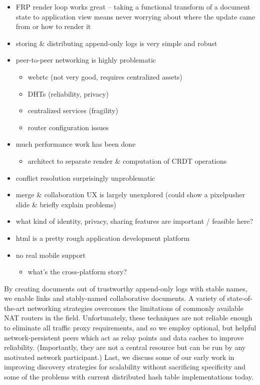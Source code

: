 \documentclass[sigplan,10pt]{acmart}
\begin{document}
\begin{itemize}
    \item FRP render loop works great -- taking a functional transform of a document state to application view means never worrying about where the update came from or how to render it
	\item storing \& distributing append-only logs is very simple and robust
    \item peer-to-peer networking is highly problematic
    \begin{itemize}
	    \item webrtc (not very good, requires centralized assets)
		\item DHTs (reliability, privacy)
		\item centralized services (fragility)
		\item router configuration issues
	\end{itemize}
	\item much performance work has been done
	\begin{itemize}
	    \item architect to separate render \& computation of CRDT operations
	\end{itemize}
	\item conflict resolution surprisingly unproblematic
	\item merge \& collaboration UX is largely unexplored (could show a pixelpusher slide \& briefly explain problems)
	\item what kind of identity, privacy, sharing features are important / feasible here?
	\item html is a pretty rough application development platform
	\item no real mobile support
	\begin{itemize}
	    \item what's the cross-platform story?
	\end{itemize}
\end{itemize}

By creating documents out of trustworthy append-only logs with stable names, we enable links and stably-named collaborative documents. A variety of state-of-the-art networking strategies overcomes the limitations of commonly available NAT routers in the field. Unfortunately, these techniques are not reliable enough to eliminate all traffic proxy requirements, and so we employ optional, but helpful network-persistent peers which act as relay points and data caches to improve reliability. (Importantly, they are not a central resource but can be run by any motivated network participant.) Last, we discuss some of our early work in improving discovery strategies for scalability without sacrificing specificity and some of the problems with current distributed hash table implementations today.
\end{document}
